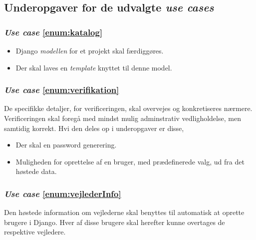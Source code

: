 \documentclass[11pt]{article}
\begin{document}
\subsection{Underopgaver for de udvalgte \textit{use cases}}
\subsubsection*{\textit{Use case} \ref{enum:katalog}}
\begin{itemize}
	\item Django \textit{modellen} for et projekt skal færdiggøres.
	\item Der skal laves en \textit{template} knyttet til denne model.
\end{itemize}

\subsubsection*{\textit{Use case} \ref{enum:verifikation}}
De specifikke detaljer, for verificeringen, skal overvejes og konkretiseres nærmere. Verificeringen skal foregå med mindst mulig adminstrativ vedligholdelse, men samtidig korrekt. Hvi den deles op i underopgaver er disse,
\begin{itemize}
	\item Der skal en password generering.
	\item Muligheden for oprettelse af en bruger, med prædefinerede valg, ud fra det høstede data.
\end{itemize}

\subsubsection*{\textit{Use case} \ref{enum:vejlederInfo}}
Den høstede information om vejlederne skal benyttes til automatisk at oprette brugere i Django. Hver af disse brugere skal herefter kunne overtages de respektive vejledere.
\end{document}
